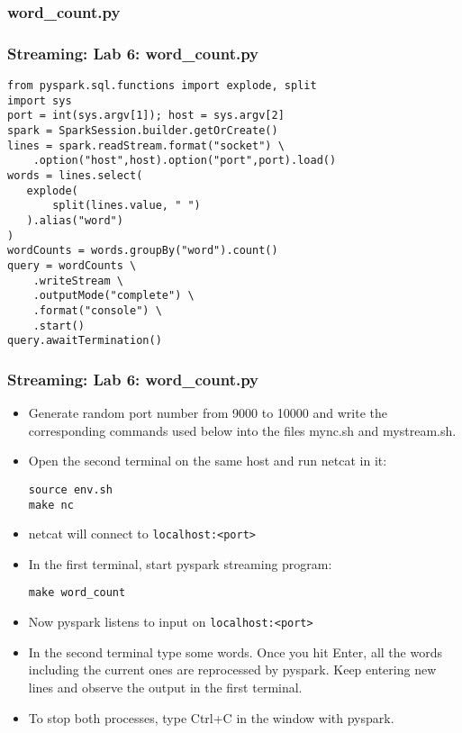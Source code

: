 \documentclass{beamer}
\begin{document}
\subsubsection{word\_count.py}
\begin{frame}[fragile]
\frametitle{Streaming: Lab 6: word\_count.py}
{\small
{\color{mycolorcode}
\begin{verbatim}
from pyspark.sql.functions import explode, split
import sys
port = int(sys.argv[1]); host = sys.argv[2]
spark = SparkSession.builder.getOrCreate()
lines = spark.readStream.format("socket") \
    .option("host",host).option("port",port).load()
words = lines.select(
   explode(
       split(lines.value, " ")
   ).alias("word")
)
wordCounts = words.groupBy("word").count()
query = wordCounts \
    .writeStream \
    .outputMode("complete") \
    .format("console") \
    .start()
query.awaitTermination()
\end{verbatim}
}}
\end{frame}

\begin{frame}[fragile]
\frametitle{Streaming: Lab 6: word\_count.py}
\begin{itemize}
\item Generate random port number from 9000 to 10000 and write the corresponding commands used below into the files 
  {\color{mycolorcli}mync.sh} and {\color{mycolorcli}mystream.sh}.
\item Open the second terminal on the same host and run {\color{mycolorcli}netcat} in it:
{\color{mycolorcli}
\begin{verbatim}
source env.sh
make nc
\end{verbatim}
}
\item netcat will connect to {\color{mycolorcli}\verb|localhost:<port>|}
\item In the first terminal, start pyspark streaming program:
{\color{mycolorcli}
\begin{verbatim}
make word_count
\end{verbatim}
}
\item Now pyspark listens to input on {\color{mycolorcli}\verb|localhost:<port>|}
\item In the second terminal type some words. Once you hit {\color{mycolorcli}Enter}, 
  all the words including the current ones are reprocessed by pyspark. 
  Keep entering new lines and observe the output in the first terminal.
\item To stop both processes, type {\color{mycolorcli}Ctrl+C} in the window with pyspark.
\end{itemize}
\end{frame}
\end{document}
